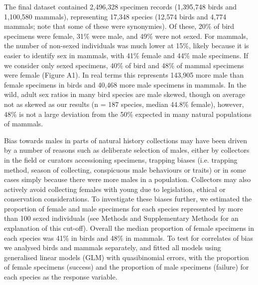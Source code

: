 \documentclass[a4paper, 12pt]{article}
\begin{document}
The final dataset contained 2,496,328 specimen records (1,395,748 birds and 1,100,580 mammals), representing 17,348 species (12,574 birds and 4,774 mammals; note that some of these were synonymies). 
Of these, 20\% of bird specimens were female, 31\% were male, and 49\% were not sexed. 
For mammals, the number of non-sexed individuals was much lower at 15\%, likely because it is easier to identify sex in mammals, with 41\% female and 44\% male specimens. 
If we consider only sexed specimens, 40\% of bird and 48\% of mammal specimens were female (Figure A1). 
In real terms this represents 143,905 more male than female specimens in birds and 40,468 more male specimens in mammals. 
In the wild, adult sex ratios in many bird species are male skewed, though on average not as skewed as our results (n = 187 species, median 44.8\% female\cite{szekely2014sex}), however, 48\% is not a large deviation from the 50\% expected in many natural populations of mammals\cite{karlin1986theoretical}.

Bias towards males in parts of natural history collections may have been driven by a number of reasons such as deliberate selection of males, either by collectors in the field or curators accessioning specimens, trapping biases (i.e. trapping method, season of collecting, conspicuous male behaviours or traits) or in some cases simply because there were more males in a population. 
Collectors may also actively avoid collecting females with young due to legislation, ethical or conservation considerations. 
To investigate these biases further, we estimated the proportion of female and male specimens for each species represented by more than 100 sexed individuals (see Methods and Supplementary Methods for an explanation of this cut-off). 
Overall the median proportion of female specimens in each species was 41\% in birds and 48\% in mammals. 
To test for correlates of bias we analysed birds and mammals separately, and fitted all models using generalised linear models (GLM) with quasibinomial errors, with the proportion of female specimens (success) and the proportion of male specimens (failure) for each species as the response variable.
\end{document}
